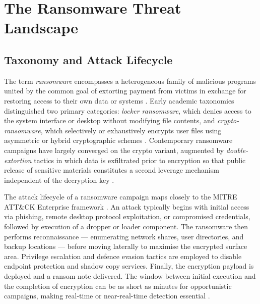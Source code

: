 \section{The Ransomware Threat Landscape}
\label{sec:lit_threat}

\subsection{Taxonomy and Attack Lifecycle}
\label{sec:lit_taxonomy}

The term \emph{ransomware} encompasses a heterogeneous family of malicious programs united by
the common goal of extorting payment from victims in exchange for restoring access to their
own data or systems \cite{razaulla2023age}.
Early academic taxonomies distinguished two primary categories: \emph{locker ransomware}, which
denies access to the system interface or desktop without modifying file contents, and
\emph{crypto-ransomware}, which selectively or exhaustively encrypts user files using
asymmetric or hybrid cryptographic schemes \cite{moussaileb2021survey, sikorski2012practical}.
Contemporary ransomware campaigns have largely converged on the crypto variant, augmented by
\emph{double-extortion} tactics in which data is exfiltrated prior to encryption so that
public release of sensitive materials constitutes a second leverage mechanism independent of
the decryption key \cite{beaman2021ransomware, meland2020ransomware}.

The attack lifecycle of a ransomware campaign maps closely to the MITRE ATT\&CK Enterprise
framework \cite{razaulla2023age}.
An attack typically begins with initial access via phishing, remote desktop protocol
exploitation, or compromised credentials, followed by execution of a dropper or loader
component.
The ransomware then performs reconnaissance — enumerating network shares, user directories,
and backup locations — before moving laterally to maximise the encrypted surface area.
Privilege escalation and defence evasion tactics are employed to disable endpoint protection
and shadow copy services.
Finally, the encryption payload is deployed and a ransom note delivered.
The window between initial execution and the completion of encryption can be as short as
minutes for opportunistic campaigns, making real-time or near-real-time detection
essential \cite{SgandurraMML16, hirano2022ransap}.

